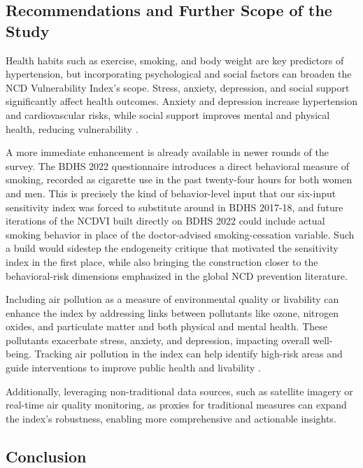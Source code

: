 \documentclass[
  12pt,
  a4paper]{article}
\begin{document}
\subsection{Recommendations and Further Scope of the Study}\label{recommendations-and-further-scope-of-the-study}

Health habits such as exercise, smoking, and body weight are key predictors of hypertension, but incorporating psychological and social factors can broaden the NCD Vulnerability Index's scope. Stress, anxiety, depression, and social support significantly affect health outcomes. Anxiety and depression increase hypertension and cardiovascular risks, while social support improves mental and physical health, reducing vulnerability \citep{stewart1992measuring, cohen2015state, berkman1984assessing}.

A more immediate enhancement is already available in newer rounds of the survey. The BDHS 2022 questionnaire introduces a direct behavioral measure of smoking, recorded as cigarette use in the past twenty-four hours for both women and men. This is precisely the kind of behavior-level input that our six-input sensitivity index was forced to substitute around in BDHS 2017-18, and future iterations of the NCDVI built directly on BDHS 2022 could include actual smoking behavior in place of the doctor-advised smoking-cessation variable. Such a build would sidestep the endogeneity critique that motivated the sensitivity index in the first place, while also bringing the construction closer to the behavioral-risk dimensions emphasized in the global NCD prevention literature.

Including air pollution as a measure of environmental quality or livability can enhance the index by addressing links between pollutants like ozone, nitrogen oxides, and particulate matter and both physical and mental health. These pollutants exacerbate stress, anxiety, and depression, impacting overall well-being. Tracking air pollution in the index can help identify high-risk areas and guide interventions to improve public health and livability \citep{carlisle2001exercise, cai2016associations}.

Additionally, leveraging non-traditional data sources, such as satellite imagery or real-time air quality monitoring, as proxies for traditional measures can expand the index's robustness, enabling more comprehensive and actionable insights.

\subsection{Conclusion}\label{conclusion}
\end{document}
